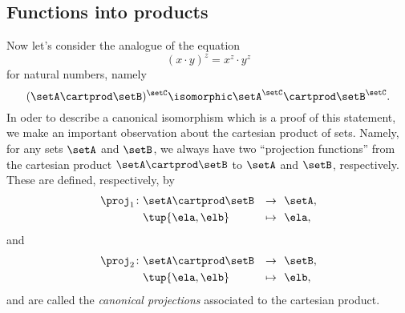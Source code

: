 \subsection{Functions into products}

Now let's consider the analogue of the equation
\begin{equation}
(x \cdot y)^z = x^z \cdot y^z
\end{equation}
for natural numbers, namely
\begin{equation}
 (\setA \cartprod \setB)^{\setC}  \isomorphic  \setA^\setC \cartprod \setB^\setC.
\end{equation}
In oder to describe a canonical isomorphism which is a proof of this statement, we make an important observation about the cartesian product of sets. Namely, for any sets $\setA$ and $\setB$, we always have two ``projection functions'' from the cartesian product $\setA \cartprod \setB$ to $\setA$ and $\setB$, respectively. These are defined, respectively, by 
\begin{equation}
\begin{aligned}
    \proj_1 \colon   & \setA \cartprod \setB & \to & \ \ \setA, \\
         & \tup{\ela, \elb} & \mapsto & \ \  \ela,
\end{aligned}
\end{equation}
and
\begin{equation}
\begin{aligned}
    \proj_2 \colon   & \setA \cartprod \setB & \to & \ \ \setB, \\
         & \tup{\ela, \elb} & \mapsto & \ \  \elb,
\end{aligned}
\end{equation}
and are called the \emph{canonical projections} associated to the cartesian product. 

